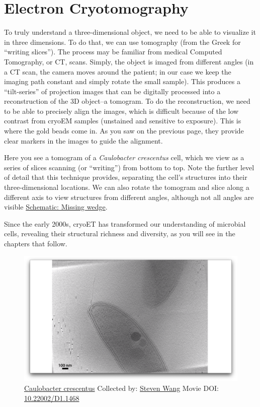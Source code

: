 \documentclass[]{tufte-book}
\begin{document}
\section{Electron Cryotomography}\label{electron-cryotomography}

To truly understand a three-dimensional object, we need to be able to
visualize it in three dimensions. To do that, we can use tomography
(from the Greek for ``writing slices''). The process may be familiar
from medical Computed Tomography, or CT, scans. Simply, the object is
imaged from different angles (in a CT scan, the camera moves around the
patient; in our case we keep the imaging path constant and simply rotate
the small sample). This produces a ``tilt-series'' of projection images
that can be digitally processed into a reconstruction of the 3D
object--a tomogram. To do the reconstruction, we need to be able to
precisely align the images, which is difficult because of the low
contrast from cryoEM samples (unstained and sensitive to exposure). This
is where the gold beads come in. As you saw on the previous page, they
provide clear markers in the images to guide the alignment.

Here you see a tomogram of a \emph{Caulobacter crescentus} cell, which
we view as a series of slices scanning (or ``writing'') from bottom to
top. Note the further level of detail that this technique provides,
separating the cell's structures into their three-dimensional locations.
We can also rotate the tomogram and slice along a different axis to view
structures from different angles, although not all angles are visible
\protect\hyperlink{Missing_wedge}{Schematic: Missing wedge}.

Since the early 2000s, cryoET has transformed our understanding of
microbial cells, revealing their structural richness and diversity, as
you will see in the chapters that follow.





\begin{figure}
\includegraphics{movie_stills/1_6} \caption[\protect\hyperlink{tree}{Caulobacter crescentus} Collected by:
\protect\hyperlink{steven_wang}{Steven Wang} Movie DOI:
\href{https://doi.org/10.22002/D1.1468}{10.22002/D1.1468}]{\protect\hyperlink{tree}{Caulobacter crescentus} Collected by:
\protect\hyperlink{steven_wang}{Steven Wang} Movie DOI:
\href{https://doi.org/10.22002/D1.1468}{10.22002/D1.1468}}\label{fig:1-6}
\end{figure}
\end{document}
